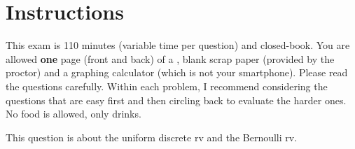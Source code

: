 \documentclass[12pt]{article}
\begin{document}
\section*{Instructions}
This exam is 110 minutes (variable time per question) and closed-book. You are allowed \textbf{one} page (front and back) of a , blank scrap paper (provided by the proctor) and a graphing calculator (which is not your smartphone). Please read the questions carefully. Within each problem, I recommend considering the questions that are easy first and then circling back to evaluate the harder ones. No food is allowed, only drinks. %

\pagebreak

\problem This question is about the uniform discrete rv and the Bernoulli rv.
\end{document}
